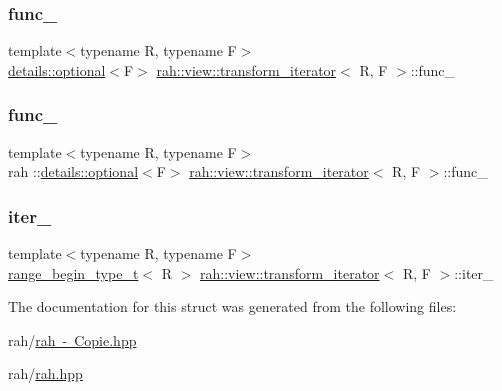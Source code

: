 \subsubsection{\texorpdfstring{func\_}{func\_}\hspace{0.1cm}{\footnotesize\ttfamily [1/2]}}
{\footnotesize\ttfamily template$<$typename R, typename F$>$ \\
\mbox{\hyperlink{structrah_1_1view_1_1details_1_1optional}{details\+::optional}}$<$F$>$ \mbox{\hyperlink{structrah_1_1view_1_1transform__iterator}{rah\+::view\+::transform\+\_\+iterator}}$<$ R, F $>$\+::func\+\_\+}

\mbox{\label{structrah_1_1view_1_1transform__iterator_a0916160a830ab134bf224102ae102017}} 
\subsubsection{\texorpdfstring{func\_}{func\_}\hspace{0.1cm}{\footnotesize\ttfamily [2/2]}}
{\footnotesize\ttfamily template$<$typename R, typename F$>$ \\
rah \+::\mbox{\hyperlink{structrah_1_1view_1_1details_1_1optional}{details\+::optional}}$<$F$>$ \mbox{\hyperlink{structrah_1_1view_1_1transform__iterator}{rah\+::view\+::transform\+\_\+iterator}}$<$ R, F $>$\+::func\+\_\+}

\mbox{\label{structrah_1_1view_1_1transform__iterator_a349798fe3a741068fd28e50387f39e80}} 
\subsubsection{\texorpdfstring{iter\_}{iter\_}}
{\footnotesize\ttfamily template$<$typename R, typename F$>$ \\
\mbox{\hyperlink{namespacerah_a28aff4eeddcece6be65ff0b956d32d4a}{range\+\_\+begin\+\_\+type\+\_\+t}}$<$ R $>$ \mbox{\hyperlink{structrah_1_1view_1_1transform__iterator}{rah\+::view\+::transform\+\_\+iterator}}$<$ R, F $>$\+::iter\+\_\+}



The documentation for this struct was generated from the following files\+:\begin{DoxyCompactItemize}
\item 
rah/\mbox{\hyperlink{rah_01-_01_copie_8hpp}{rah -\/ Copie.\+hpp}}\item 
rah/\mbox{\hyperlink{rah_8hpp}{rah.\+hpp}}\end{DoxyCompactItemize}
